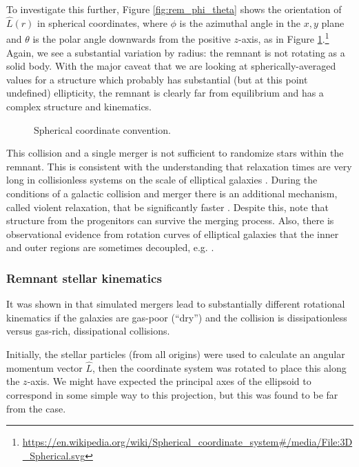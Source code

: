 \documentclass[twocolumn]{aastex63}
\newcommand{\todo}{\color{red}{TODO}\color{black}\hspace{2mm}}
\begin{document}
To investigate this further, Figure \ref{fig:rem_phi_theta} shows the orientation of $\hat{L}(r)$ in spherical coordinates, where $\phi$ is the azimuthal angle in the $x,y$ plane and $\theta$ is the polar angle downwards from the positive $z$-axis, as in Figure \ref{fig:sph_coord}.\footnote{\url{https://en.wikipedia.org/wiki/Spherical\_coordinate\_system\#/media/File:3D\_Spherical.svg}} Again, we see a substantial variation by radius: the remnant is not rotating as a solid body. With the major caveat that we are looking at spherically-averaged values for a structure which probably has substantial (but at this point undefined) ellipticity, the remnant is clearly far from equilibrium and has a complex structure and kinematics.

\begin{figure}[htb!]
	\caption{Spherical coordinate convention.
		\label{fig:sph_coord}}
\end{figure}

This collision and a single merger is not sufficient to randomize stars within the remnant. This is consistent with the understanding that relaxation times are very long in collisionless systems on the scale of elliptical galaxies \citep[Section 1.2]{binney_galactic_2008}. During the conditions of a galactic collision and merger there is an additional mechanism, called violent relaxation, that be significantly faster \citep[Section 4.10.2]{binney_galactic_2008}. Despite this, \citet{barnes_dynamics_1992} note that structure from the progenitors can survive the merging process. Also, there is observational evidence from rotation curves of elliptical galaxies that the inner and outer regions are sometimes decoupled, e.g. \citep{napolitano_ngc_2002}.

\todo{distinguish by origin}


\subsubsection{Remnant stellar kinematics}

It was shown in \citep{cox_kinematic_2006} that simulated mergers lead to substantially different rotational kinematics if the galaxies are gas-poor (``dry'') and the collision is dissipationless versus gas-rich, dissipational collisions. 

Initially, the stellar particles (from all origins) were used to calculate an angular momentum vector $\hat{L}$, then the coordinate system was rotated to place this along the $z$-axis. We might have expected the principal axes of the ellipsoid to correspond in some simple way to this projection, but this was found to be far from the case.
\end{document}
